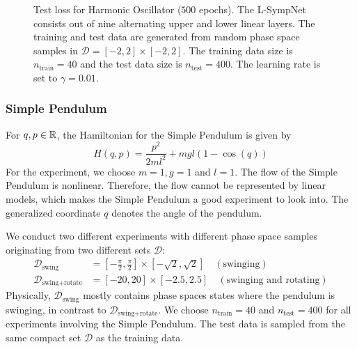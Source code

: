 \documentclass[twoside,a4paper]{article}
\begin{document}
\begin{figure}
\centering
{}
\caption{Test loss for Harmonic Oscillator ($500$ epochs). The L-SympNet consists out of nine alternating upper and 
lower linear layers. The training and test data are generated from random phase space samples in 
$\mathcal{D} = [-2,2] \times [-2,2]$. The training data size is $n_{\text{train}} = 40$
and the test data size is $n_{\text{test}}=400$.
The learning rate is set to $\gamma = 0.01$.}\label{fig_harm_osc_loss}
\end{figure}

\subsubsection{Simple Pendulum}

For $q,p \in \mathbb{R}$, the Hamiltonian for the Simple Pendulum is given by
\begin{equation*}
	H(q,p) = \frac{p^2}{2ml^2} + mgl (1-\cos(q))
\end{equation*}
For the experiment, we choose $m=1, g=1$ and $l=1$. The flow of the Simple Pendulum is nonlinear.
Therefore, the flow cannot be represented by linear models, which makes the Simple Pendulum
a good experiment to look into. The generalized coordinate $q$ denotes the angle of the pendulum.

We conduct two different experiments with different
phase space samples originating from two different sets $\mathcal{D}$:
\begin{align*}
	\mathcal{D}_{\text{swing}} &= [-\frac{\pi}{2}, \frac{\pi}{2}] \times [-\sqrt{2}, \sqrt{2}]
	\quad (\text{swinging}) \\
	\mathcal{D}_{\text{swing+rotate}} &= [-20, 20] \times [-2.5, 2.5]
	\quad (\text{swinging and rotating})
\end{align*}
Physically, $\mathcal{D}_{\text{swing}}$ mostly contains phase spaces states where
the pendulum is swinging, in contrast to $\mathcal{D}_{\text{swing+rotate}}$.
We choose $n_{\text{train}} = 40$ and $n_{\text{test}} = 400$ for all experiments involving
the Simple Pendulum. The test data is sampled from the same compact set $\mathcal{D}$ as the training data.
\end{document}
